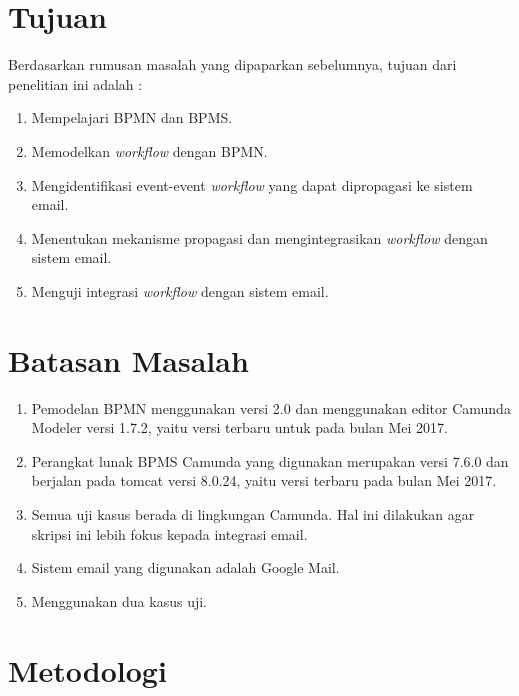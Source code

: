 \section{Tujuan}
\label{sec:tujuan}

Berdasarkan rumusan masalah yang dipaparkan sebelumnya, tujuan dari penelitian ini adalah :
\begin{enumerate}
	\item Mempelajari BPMN dan BPMS.
	\item Memodelkan \textit{workflow} dengan BPMN.
	\item Mengidentifikasi event-event \textit{workflow} yang dapat dipropagasi ke sistem email.
	\item Menentukan mekanisme propagasi dan mengintegrasikan \textit{workflow} dengan sistem email.
	\item Menguji integrasi \textit{workflow} dengan sistem email.
\end{enumerate}




\section{Batasan Masalah}
\label{sec:batasan}
\begin{enumerate}
	\item Pemodelan BPMN menggunakan versi 2.0 dan menggunakan editor Camunda Modeler versi 1.7.2, yaitu versi terbaru untuk pada bulan Mei 2017.
	\item Perangkat lunak BPMS Camunda yang digunakan merupakan versi 7.6.0 dan berjalan pada tomcat versi 8.0.24, yaitu versi terbaru pada bulan Mei 2017.
	\item Semua uji kasus berada di lingkungan Camunda. Hal ini dilakukan agar skripsi ini lebih fokus kepada integrasi email.
	\item Sistem email yang digunakan adalah Google Mail.
	\item Menggunakan dua kasus uji.
\end{enumerate}




\section{Metodologi}
\label{sec:metlit}

